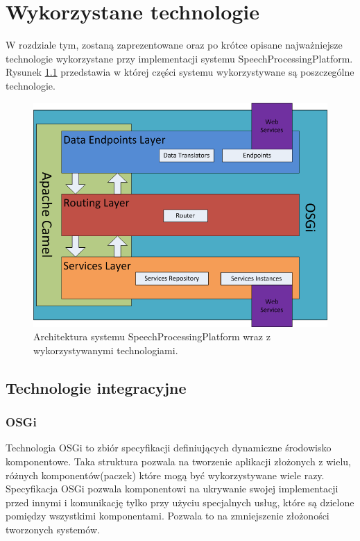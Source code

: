 \ifpdf
    \graphicspath{{3/figures/PNG/}{3/figures/PDF/}{3/figures/}}
\else
    \graphicspath{{3/figures/EPS/}{3/figures/}}
\fi
\chapter{Wykorzystane technologie} %


W rozdziale tym, zostaną zaprezentowane oraz po krótce opisane najważniejsze technologie wykorzystane przy implementacji systemu SpeechProcessingPlatform. Rysunek \ref{fig:architecture_and_technologies} przedstawia w której części systemu wykorzystywane są poszczególne technologie.

\begin{figure}[!h]
	\centering
	\includegraphics[scale=0.45]{layered_architecture_and_technologies.png} 
	\caption{Architektura systemu SpeechProcessingPlatform wraz z wykorzystywanymi technologiami.}
\label{fig:architecture_and_technologies}
\end{figure}

\section{Technologie integracyjne}
\subsection{OSGi}
Technologia OSGi to zbiór specyfikacji definiujących dynamiczne środowisko komponentowe. Taka struktura pozwala na tworzenie aplikacji złożonych z wielu, różnych komponentów(paczek) które mogą być wykorzystywane wiele razy. Specyfikacja OSGi pozwala komponentowi na ukrywanie swojej implementacji przed innymi i komunikację tylko przy użyciu specjalnych usług, które są dzielone pomiędzy wszystkimi komponentami. Pozwala to na zmniejszenie złożoności tworzonych systemów.


